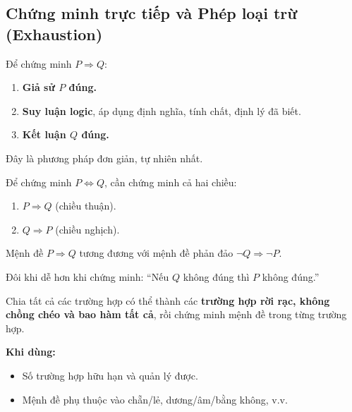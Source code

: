 \documentclass[12pt,a4paper]{article}
\begin{document}
\subsection{Chứng minh trực tiếp và Phép loại trừ (Exhaustion)}

\begin{phuongphap}[title={Chứng minh trực tiếp (Direct Proof)}]
  Để chứng minh $P \Rightarrow Q$:
  \begin{enumerate}
    \item \textbf{Giả sử $P$ đúng.}
    \item \textbf{Suy luận logic}, áp dụng định nghĩa, tính chất, định lý đã biết.
    \item \textbf{Kết luận $Q$ đúng.}
  \end{enumerate}
  Đây là phương pháp đơn giản, tự nhiên nhất.
\end{phuongphap}

\begin{phuongphap}[title={Chứng minh thuận -- nghịch chiều (Biconditional)}]
  Để chứng minh $P \Leftrightarrow Q$, cần chứng minh cả hai chiều:
  \begin{enumerate}
    \item $P \Rightarrow Q$ (chiều thuận).
    \item $Q \Rightarrow P$ (chiều nghịch).
  \end{enumerate}
\end{phuongphap}

\begin{phuongphap}[title={Chứng minh phản đảo (Proof by Contrapositive)}]
  Mệnh đề $P \Rightarrow Q$ tương đương với mệnh đề phản đảo $\neg Q \Rightarrow \neg P$.

  Đôi khi dễ hơn khi chứng minh: ``Nếu $Q$ không đúng thì $P$ không đúng.''
\end{phuongphap}

\begin{phuongphap}[title={Phép loại trừ (Proof by Exhaustion / Case Analysis)}]
  Chia tất cả các trường hợp có thể thành các \textbf{trường hợp rời rạc, không chồng chéo và bao hàm tất cả}, rồi chứng minh mệnh đề trong từng trường hợp.

  \textbf{Khi dùng:}
  \begin{itemize}
    \item Số trường hợp hữu hạn và quản lý được.
    \item Mệnh đề phụ thuộc vào chẵn/lẻ, dương/âm/bằng không, v.v.
  \end{itemize}
\end{phuongphap}
\end{document}
